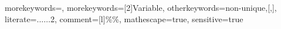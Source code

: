  {
  morekeywords={},
  morekeywords=[2]{Variable},
  otherkeywords={non-unique,[,]}, %
  literate={...}{$\ldots$}2,
  comment=[l]{\%\%},
  mathescape=true,
  sensitive=true
}

\newcommand{\atermcode}[1]{\lstinline[language=ATerm,basicstyle=\lstinlinestyle]{#1}}
